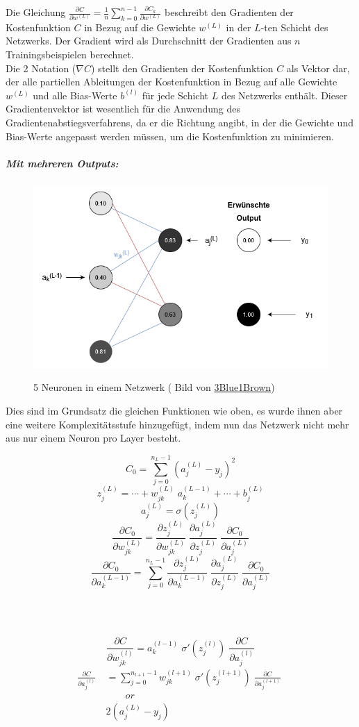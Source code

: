 \noindent Die Gleichung $\frac{\partial C}{\partial w^{(L)}} = \frac{1}{n}\sum_{k=0}^{n-1} \frac{\partial C_{k}}{\partial w^{(L)}}$ beschreibt den Gradienten der Kostenfunktion $C$ in Bezug auf die Gewichte $w^{(L)}$ in der $L$-ten Schicht des Netzwerks. Der Gradient wird als Durchschnitt der Gradienten aus $n$ Trainingsbeispielen berechnet.
\\
\noindent Die 2 Notation ($\nabla C$) stellt den Gradienten der Kostenfunktion $C$ als Vektor dar, der alle partiellen Ableitungen der Kostenfunktion in Bezug auf alle Gewichte $w^{(L)}$ und alle Bias-Werte $b^{(l)}$ für jede Schicht $L$ des Netzwerks enthält. Dieser Gradientenvektor ist wesentlich für die Anwendung des Gradientenabstiegsverfahrens, da er die Richtung angibt, in der die Gewichte und Bias-Werte angepasst werden müssen, um die Kostenfunktion zu minimieren.

\subparagraph{Mit mehreren Outputs:}

\begin{figure}[H]
	\centering
		\includegraphics[width=0.75\linewidth]{images/nn5bp.png}
	\label{fig:nn5bp}
	\caption{5 Neuronen in einem Netzwerk ( Bild von \href{https://www.youtube.com/watch?v=tIeHLnjs5U8}{3Blue1Brown})}
\end{figure}


Dies sind im Grundsatz die gleichen Funktionen wie oben, es wurde ihnen aber eine weitere Komplexitätsstufe hinzugefügt, indem nun das Netzwerk nicht mehr aus nur einem Neuron pro Layer besteht.

\[C_0 = \sum_{j=0}^{n_{L}-1} (a_j^{(L)} - y_j)^2\]
\[z_j^{(L)} = \cdots + w_{jk}^{(L)}\; a_k^{(L-1)} + \cdots + b_j^{(L)}\]
\[a_j^{(L)} = \sigma(z_j^{(L)})\]
\[\frac{\partial C_0}{\partial w_{jk}^{(L)}} = \frac{\partial z_j^{(L)}}{\partial w_{jk}^{(L)}}\; \frac{\partial a_j^{(L)}}{\partial z_j^{(L)}}\; \frac{\partial C_0}{\partial a_j^{(L)}}\]
\[\frac{\partial C_0}{\partial a_k^{(L-1)}} = \sum_{j=0}^{n_{L} - 1} \frac{\partial z_j^{(L)}}{\partial a_k^{(L-1)}}\; \frac{\partial a_j^{(L)}}{\partial z_j^{(L)}}\; \frac{\partial C_0}{\partial a_j^{(L)}}\]

\mbox{}\\\

\[\frac{\partial C}{\partial w_{jk}^{(l)}} = a_k^{(l-1)}\; \sigma '(z_j^{(l)})\; \frac{\partial C}{\partial a_j^{(l)}}\]
\[
\begin{split}
\frac{\partial C}{\partial a_j^{(l)}}\  & = \sum_{j=0}^{n_{l+1}-1} w_{jk}^{(l+1)}\; \sigma '(z_j^{(l+1)})\; \frac{\partial C}{\partial a_j^{(l+1)}}\; \\
&\qquad or \\
& 2(a_j^{(L)}-y_j)
\end{split}
\]